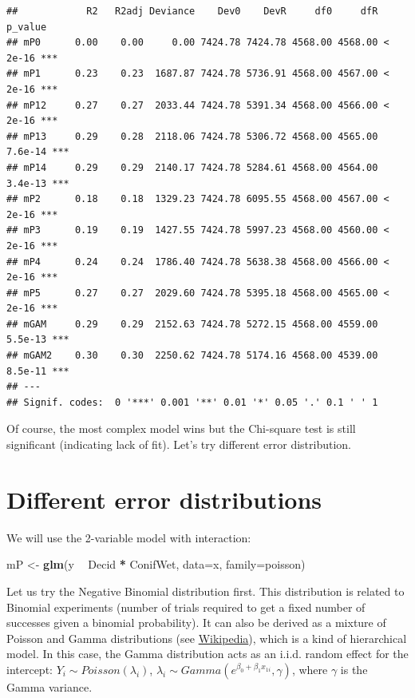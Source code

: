 \documentclass[12pt,]{book}
\newenvironment{Shaded}{\begin{snugshade}}{\end{snugshade}}
\newcommand{\DataTypeTok}[1]{\textcolor[rgb]{0.13,0.29,0.53}{#1}}
\newcommand{\KeywordTok}[1]{\textcolor[rgb]{0.13,0.29,0.53}{\textbf{#1}}}
\newcommand{\NormalTok}[1]{#1}
\newcommand{\OperatorTok}[1]{\textcolor[rgb]{0.81,0.36,0.00}{\textbf{#1}}}
\newcommand{\StringTok}[1]{\textcolor[rgb]{0.31,0.60,0.02}{#1}}
\begin{document}
\begin{verbatim}
##            R2   R2adj Deviance    Dev0    DevR     df0     dfR p_value    
## mP0      0.00    0.00     0.00 7424.78 7424.78 4568.00 4568.00 < 2e-16 ***
## mP1      0.23    0.23  1687.87 7424.78 5736.91 4568.00 4567.00 < 2e-16 ***
## mP12     0.27    0.27  2033.44 7424.78 5391.34 4568.00 4566.00 < 2e-16 ***
## mP13     0.29    0.28  2118.06 7424.78 5306.72 4568.00 4565.00 7.6e-14 ***
## mP14     0.29    0.29  2140.17 7424.78 5284.61 4568.00 4564.00 3.4e-13 ***
## mP2      0.18    0.18  1329.23 7424.78 6095.55 4568.00 4567.00 < 2e-16 ***
## mP3      0.19    0.19  1427.55 7424.78 5997.23 4568.00 4560.00 < 2e-16 ***
## mP4      0.24    0.24  1786.40 7424.78 5638.38 4568.00 4566.00 < 2e-16 ***
## mP5      0.27    0.27  2029.60 7424.78 5395.18 4568.00 4565.00 < 2e-16 ***
## mGAM     0.29    0.29  2152.63 7424.78 5272.15 4568.00 4559.00 5.5e-13 ***
## mGAM2    0.30    0.30  2250.62 7424.78 5174.16 4568.00 4539.00 8.5e-11 ***
## ---
## Signif. codes:  0 '***' 0.001 '**' 0.01 '*' 0.05 '.' 0.1 ' ' 1
\end{verbatim}

Of course, the most complex model wins
but the Chi-square test is still significant (indicating lack of fit).
Let's try different error distribution.

\hypertarget{different-error-distributions}{%
\section{Different error distributions}\label{different-error-distributions}}

We will use the 2-variable model with interaction:

\begin{Shaded}
\begin{Highlighting}[]
\NormalTok{mP <-}\StringTok{ }\KeywordTok{glm}\NormalTok{(y }\OperatorTok{~}\StringTok{ }\NormalTok{Decid }\OperatorTok{*}\StringTok{ }\NormalTok{ConifWet, }\DataTypeTok{data=}\NormalTok{x, }\DataTypeTok{family=}\NormalTok{poisson)}
\end{Highlighting}
\end{Shaded}

Let us try the Negative Binomial distribution first.
This distribution is related to Binomial experiments
(number of trials required to get a fixed number of successes
given a binomial probability). It can also be derived
as a mixture of Poisson and Gamma distributions
(see \href{https://en.wikipedia.org/wiki/Negative_binomial_distribution\#Gamma\%E2\%80\%93Poisson_mixture}{Wikipedia}),
which is a kind of hierarchical model.
In this case, the Gamma distribution acts as an i.i.d.
random effect for the intercept:
\(Y_i\sim Poisson(\lambda_i)\),
\(\lambda_i \sim Gamma(e^{\beta_0+\beta_1 x_{1i}}, \gamma)\),
where \(\gamma\) is the Gamma variance.
\end{document}
